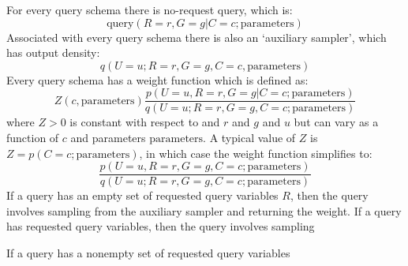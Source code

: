 \documentclass{article}
\begin{document}
\noindent For every query schema there is no-request query, which is:
\begin{equation}
    \mbox{query}(R=r, G=g | C=c; \mbox{parameters})
\end{equation}
Associated with every query schema there is also an `auxiliary sampler', which has output density:
\begin{equation}
    q(U=u; R=r, G=g, C=c, \mbox{parameters})
\end{equation}
Every query schema has a weight function which is defined as:
\begin{equation}
    Z(c, \mbox{parameters}) \frac{p(U=u, R=r, G=g| C=c; \mbox{parameters})}{q(U=u; R=r, G=g, C=c; \mbox{parameters})}
\end{equation}
where $Z > 0$ is constant with respect to and $r$ and $g$ and $u$ but can vary as a function of $c$ and parameters $\mbox{parameters}$.
A typical value of $Z$ is $Z = p(C = c; \mbox{parameters})$, in which case the weight function simplifies to:
\begin{equation}
    \frac{p(U=u, R=r, G=g, C=c; \mbox{parameters})}{q(U=u; R=r, G=g, C=c; \mbox{parameters})}
\end{equation}
If a query has an empty set of requested query variables $R$, then the query involves sampling from the auxiliary sampler and returning the weight.
If a query has requested query variables, then the query involves sampling 

If a query has a nonempty set of requested query variables 


\end{document}
